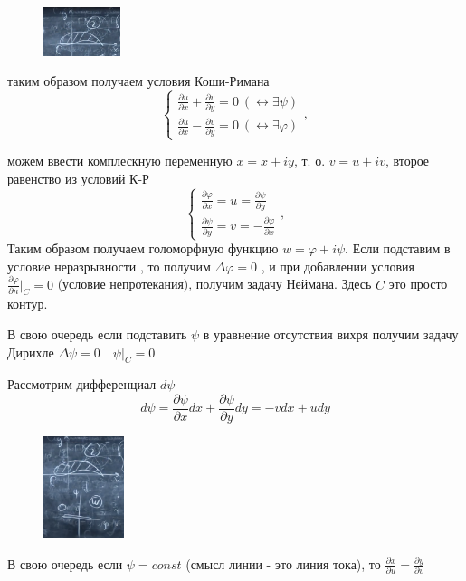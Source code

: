 \begin{figure}
	\includegraphics[width=0.2\textwidth]{14/pic_4.png}
	\caption{\label{ris:image14.4}}
\end{figure}

таким образом получаем условия Коши-Римана 
$$ \begin{cases}
\frac{\partial u}{\partial x} + \frac{\partial v}{\partial y} = 0  \ (\leftrightarrow \exists \psi)\\
\frac{\partial u}{\partial x} - \frac{\partial v}{\partial y}  = 0 \ (\leftrightarrow \exists \varphi)
\end{cases},$$

можем ввести комплескную переменную $x = x + i y$, т. о. $v = u + iv$, второе равенство из условий К-Р
$$ \begin{cases}
	\frac{\partial \varphi}{\partial x} = u  = \frac{\partial \psi}{\partial y}\\
	\frac{\partial \psi}{\partial y} = v = -\frac{\partial \varphi}{\partial x} 
\end{cases},$$
Таким образом получаем голоморфную функцию $w = \varphi + i \psi$. Если подставим в условие неразрывности , то получим $\Delta \varphi = 0$ , и при добавлении условия $\frac{\partial \varphi}{\partial n} |_C = 0 $ (условие непротекания), получим задачу Неймана. Здесь $C$ это просто контур.

В свою очередь если подставить $\psi $ в уравнение отсутствия вихря получим задачу Дирихле
$ \Delta \psi = 0 \quad \psi |_C = 0$



Рассмотрим дифференциал $d \psi$
$$
d \psi = \frac{\partial \psi}{\partial x}  dx +  \frac{\partial \psi}{\partial y}  dy = -vdx + udy
$$
\begin{figure}
	\includegraphics[width=0.21\textwidth]{14/pic_5.png}
	\caption{\label{ris:image14.5}}
\end{figure}
В свою очередь если $\psi = const $ (смысл линии - это линия тока), то $\frac{\partial x}{\partial u} = \frac{\partial y}{\partial v} $


